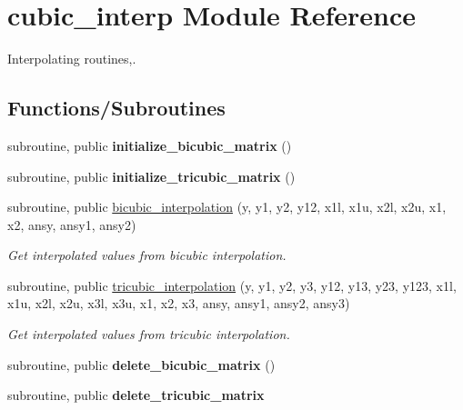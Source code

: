 \hypertarget{namespacecubic__interp}{}\section{cubic\+\_\+interp Module Reference}
\label{namespacecubic__interp}


Interpolating routines,.  


\subsection*{Functions/\+Subroutines}
\begin{DoxyCompactItemize}
\item 
\mbox{\label{namespacecubic__interp_afed9776f2ce4526ed5443e7ea51e7326}} 
subroutine, public {\bfseries initialize\+\_\+bicubic\+\_\+matrix} ()
\item 
\mbox{\label{namespacecubic__interp_a950ccb0166b8ffc61abf5fbf0358da50}} 
subroutine, public {\bfseries initialize\+\_\+tricubic\+\_\+matrix} ()
\item 
subroutine, public \mbox{\hyperlink{namespacecubic__interp_ade3b7f9c8f620bfa6154cbe10d683532}{bicubic\+\_\+interpolation}} (y, y1, y2, y12, x1l, x1u, x2l, x2u, x1, x2, ansy, ansy1, ansy2)
\begin{DoxyCompactList}\small\item\em Get interpolated values from bicubic interpolation. \end{DoxyCompactList}\item 
subroutine, public \mbox{\hyperlink{namespacecubic__interp_ad490c4ba4e83a774d3b55c284c0e381d}{tricubic\+\_\+interpolation}} (y, y1, y2, y3, y12, y13, y23, y123, x1l, x1u, x2l, x2u, x3l, x3u, x1, x2, x3, ansy, ansy1, ansy2, ansy3)
\begin{DoxyCompactList}\small\item\em Get interpolated values from tricubic interpolation. \end{DoxyCompactList}\item 
\mbox{\label{namespacecubic__interp_a11d7c3fd8b509441a6e375769e551d9a}} 
subroutine, public {\bfseries delete\+\_\+bicubic\+\_\+matrix} ()
\item 
\mbox{\label{namespacecubic__interp_ac84abe68a55f13830b66b4b277773170}} 
subroutine, public {\bfseries delete\+\_\+tricubic\+\_\+matrix}
\end{DoxyCompactItemize}
